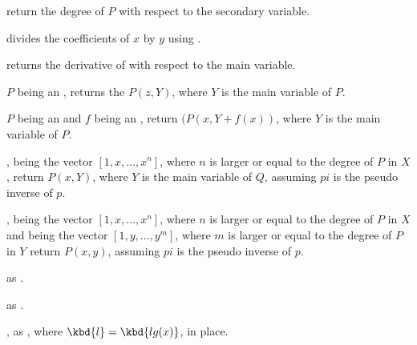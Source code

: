  return the degree of $P$ with respect to
the secondary variable.









 divides the coefficients of $x$
by $y$ using .

 returns the derivative of  with
respect to the main variable.

 $P$ being an , returns
the  $P(z,Y)$, where $Y$ is the main variable of $P$.

 $P$ being an  and $f$
being an , return $(P(x,Y+f(x))$, where $Y$ is the main variable of $P$.

, 
being the vector $[1,x,\dots,x^n]$, where $n$ is larger or equal to the degree
of $P$ in $X$, return $P(x,Y)$, where $Y$ is the main variable of $Q$, assuming
$pi$ is the pseudo inverse of $p$.

,
 being the vector $[1,x,\dots,x^n]$, where $n$ is larger or equal to the degree
of $P$ in $X$ and  being the vector $[1,y,\dots,y^m]$, where $m$ is larger or equal to the degree of $P$ in $Y$ return $P(x,y)$, assuming
$pi$ is the pseudo inverse of $p$.

 as .

 as .

, as , where
$\kbd{l} = \kbd{lg(x)}$, in place.

